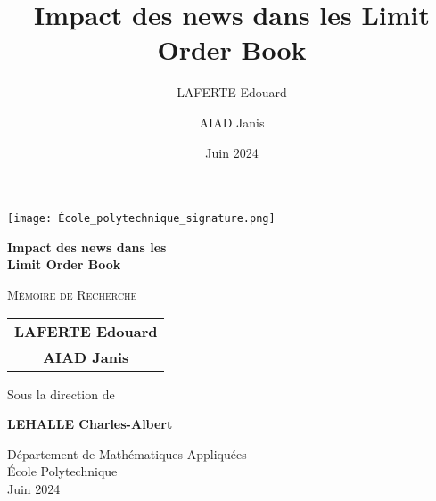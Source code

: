 \documentclass[12pt,a4paper]{article}
\title{\huge\textbf{Impact des news dans les Limit Order Book}}
\author{LAFERTE Edouard \and AIAD Janis}
\date{Juin 2024}
\theoremstyle{definition}
\theoremstyle{remark}
\begin{document}
    \begin{titlepage}
        \begin{center}
            \vspace*{2cm}
            
            \texttt{[image: École\_polytechnique\_signature.png]}
            

            
            {\huge\bfseries Impact des news dans les\\[0.4cm] 
            Limit Order Book\par}
            
            \vspace{2cm}
            
            {\Large\textsc{Mémoire de Recherche}\par}
            \vspace{1cm}
            
            {\large
            \begin{tabular}{c}
                \textbf{LAFERTE Edouard}\\[0.2cm]
                \textbf{AIAD Janis}
            \end{tabular}\par}
            
            \vspace{1.5cm}
            
            {\large Sous la direction de\par}
            \vspace{0.4cm}
            {\large\textbf{LEHALLE Charles-Albert}\par}
            
            \vfill
            
            {\large Département de Mathématiques Appliquées\\
            École Polytechnique\\[0.4cm]
            Juin 2024\par}
        \end{center}
    \end{titlepage}

    \newpage
    \null
    \thispagestyle{empty}
    \newpage
\end{document}
